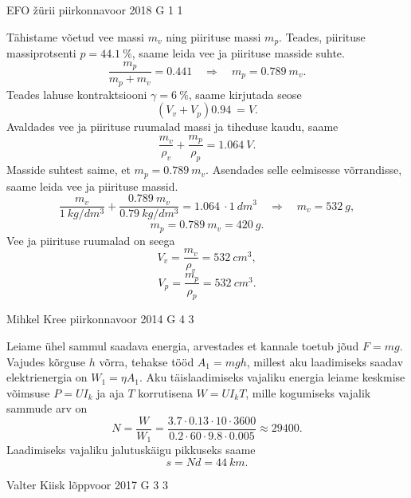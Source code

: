 \documentclass[11pt]{article}
\begin{document}
{%
{EFO žürii} %
{piirkonnavoor} %
{2018} %
{G 1} %
{1} %
{

\ifSolution
Tähistame võetud vee massi $m_v$ ning piirituse massi $m_p$. Teades, piirituse massiprotsenti $p = \SI{44,1}{\percent}$, saame leida vee ja piirituse masside suhte.
\[ \frac{m_p}{m_p+m_v}=\SI{0,441} \quad\Rightarrow\quad m_p=\SI{0,789}{}m_v.\]
Teades lahuse kontraktsiooni $\gamma = \SI{6}{\percent}$, saame kirjutada seose
\[ (V_v + V_p)\SI{0,94}{} = V.\]
Avaldades vee ja piirituse ruumalad massi ja tiheduse kaudu, saame
\[ \frac{m_v}{\rho_v} + \frac{m_p}{\rho_p} = \SI{1,064}{}V.\]
Masside suhtest saime, et $m_p=\SI{0,789}{}m_v$. Asendades selle eelmisesse võrrandisse, saame leida vee ja piirituse massid.
\[ \frac{m_v}{\SI{1}{kg/dm^3}} + \frac{\SI{0,789}{}{m_v}}{\SI{0,79}{kg/dm^3}} = \SI{1,064}{}\cdot\SI{1}{dm^3} \quad\Rightarrow\quad
m_v = \SI{532}{g},\]
\[ m_p = \SI{0,789}{}m_v = \SI{420}{g}.\]
Vee ja piirituse ruumalad on seega
\[ V_v = \frac{m_v}{\rho_v} = \SI{532}{cm^3},\]
\[ V_p = \frac{m_p}{\rho_p} = \SI{532}{cm^3}.\]
\fi
}

{Mihkel Kree} %
{piirkonnavoor} %
{2014} %
{G 4} %
{3} %
{

\ifSolution
Leiame ühel sammul saadava energia, arvestades et kannale toetub jõud $F=mg$. Vajudes kõrguse $h$ võrra, tehakse tööd $A_1 = mgh$, millest aku laadimiseks saadav elektrienergia on $W_1=\eta A_1$. 
Aku täislaadimiseks vajaliku energia leiame keskmise võimsuse $P=UI_k$ ja aja $T$ korrutisena $W=UI_kT$, mille kogumiseks vajalik sammude arv on
\[N = \frac{W}{W_1} = \frac{3.7 \cdot 0.13 \cdot 10 \cdot 3600 }{0.2 \cdot 60\cdot 9.8 \cdot 0.005}\approx29400.\]
Laadimiseks vajaliku jalutuskäigu pikkuseks saame
\[s=Nd = \SI{44}{km}.\]
\fi
}

{Valter Kiisk} %
{lõppvoor} %
{2017} %
{G 3} %
{3} %
{

}}
\end{document}
